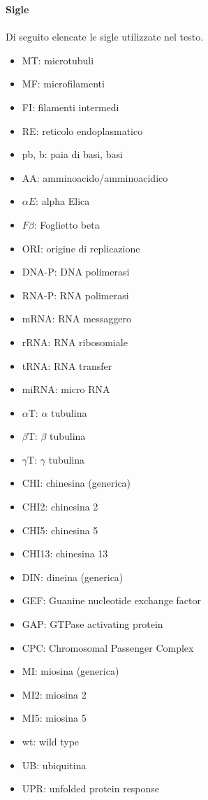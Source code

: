 \Large\textbf{Sigle}\\
\small \\
Di seguito elencate le sigle utilizzate nel testo.

\small
\begin{itemize}
    \item MT: microtubuli
    \item MF: microfilamenti
    \item FI: filamenti intermedi
    \item RE: reticolo endoplasmatico
    \item pb, b: paia di basi, basi
    \item AA: amminoacido/amminoacidico
    \item $\alpha E$: alpha Elica
    \item $F\beta$: Foglietto beta
    \item ORI: origine di replicazione
    \item DNA-P: DNA polimerasi
    \item RNA-P: RNA polimerasi
    \item mRNA: RNA messaggero
    \item rRNA: RNA ribosomiale
    \item tRNA: RNA transfer
    \item miRNA: micro RNA
    \item $\alpha$T: $\alpha$ tubulina
    \item $\beta$T: $\beta$ tubulina
    \item $\gamma$T: $\gamma$ tubulina
    \item CHI: chinesina (generica)
    \item CHI2: chinesina 2
    \item CHI5: chinesina 5
    \item CHI13: chinesina 13
    \item DIN: dineina (generica)
    \item GEF: Guanine nucleotide exchange factor
    \item GAP: GTPase activating protein
    \item CPC: Chromosomal Passenger Complex
    \item MI: miosina (generica)
    \item MI2: miosina 2
    \item MI5: miosina 5
    \item wt: wild type
    \item UB: ubiquitina
    \item UPR: unfolded protein response

\end{itemize}
